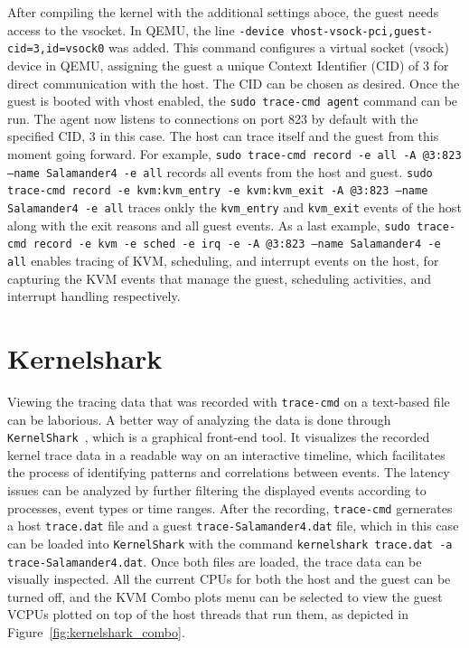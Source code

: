 \documentclass[MMR,Master,english]{twbook}
\begin{document}
\clearpage

\noindent After compiling the kernel with the additional settings aboce, the guest needs access to the vsocket. In QEMU, the line \texttt{-device vhost-vsock-pci,guest-cid=3,id=vsock0} was added. This command configures a virtual socket (vsock) device in QEMU, assigning the guest a unique Context Identifier (CID) of 3 for direct communication with the host. The CID can be chosen as desired. Once the guest is booted with vhost enabled, the \texttt{sudo trace-cmd agent} command can be run.  The agent now listens to connections on port 823 by default with the specified CID, 3 in this case. The host can trace itself and the guest from this moment going forward. For example, \texttt{sudo trace-cmd record -e all -A @3:823 --name Salamander4 -e all} records all events from the host and guest. \texttt{sudo trace-cmd record -e kvm:kvm\_entry -e kvm:kvm\_exit -A @3:823 --name Salamander4 -e all} traces onkly the \texttt{kvm\_entry} and \texttt{kvm\_exit} events of the host along with the exit reasons and all guest events. As a last example, \texttt{sudo trace-cmd record -e kvm -e sched -e irq -e -A @3:823 --name Salamander4 -e all} enables tracing of KVM, scheduling, and interrupt events on the host, for capturing the KVM events that manage the guest, scheduling activities, and interrupt handling respectively.

\section{Kernelshark}\label{sec:kernelshark}
Viewing the tracing data that was recorded with \texttt{trace-cmd} on a text-based file can be laborious. A better way of analyzing the data is done through \texttt{KernelShark}~\cite{KernelShark}, which is a graphical front-end tool. It visualizes the recorded kernel trace data in a readable way on an interactive timeline, which facilitates the process of identifying patterns and correlations between events. The latency issues can be analyzed by further filtering the displayed events according to processes, event types or time ranges. After the recording, \texttt{trace-cmd} gernerates a host \texttt{trace.dat} file and a guest \texttt{trace-Salamander4.dat} file, which in this case can be loaded into \texttt{KernelShark} with the command \texttt{kernelshark trace.dat -a trace-Salamander4.dat}. Once both files are loaded, the trace data can be visually inspected. All the current CPUs for both the host and the guest can be turned off, and the KVM Combo plots menu can be selected to view the guest VCPUs plotted on top of the host threads that run them, as depicted in Figure~\ref{fig:kernelshark_combo}.
\end{document}
